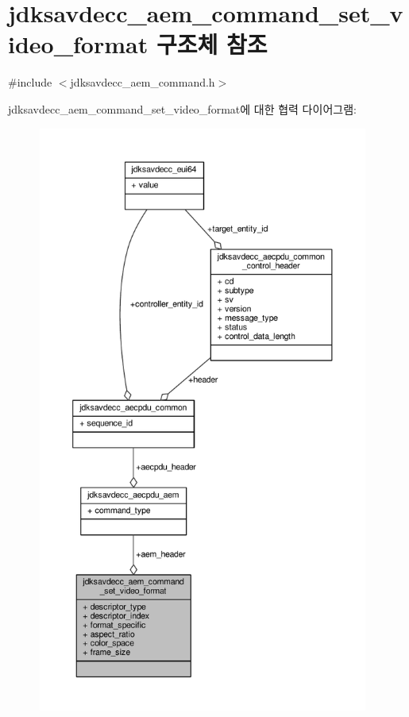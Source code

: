 \hypertarget{structjdksavdecc__aem__command__set__video__format}{}\section{jdksavdecc\+\_\+aem\+\_\+command\+\_\+set\+\_\+video\+\_\+format 구조체 참조}
\label{structjdksavdecc__aem__command__set__video__format}


{\ttfamily \#include $<$jdksavdecc\+\_\+aem\+\_\+command.\+h$>$}



jdksavdecc\+\_\+aem\+\_\+command\+\_\+set\+\_\+video\+\_\+format에 대한 협력 다이어그램\+:
\nopagebreak
\begin{figure}[H]
\begin{center}
\leavevmode
\includegraphics[height=550pt]{structjdksavdecc__aem__command__set__video__format__coll__graph}
\end{center}
\end{figure}
